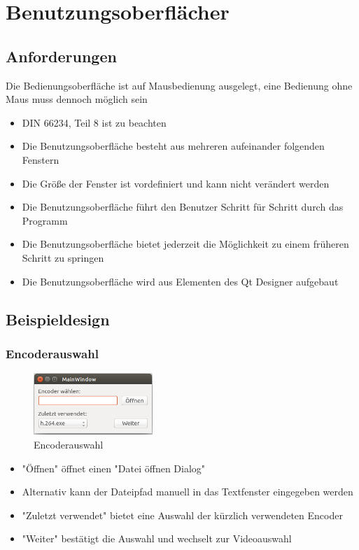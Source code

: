 \documentclass[parskip=full]{scrartcl}
\begin{document}
\section{Benutzungsoberflächer}
\subsection{Anforderungen}
Die Bedienungsoberfläche ist auf Mausbedienung ausgelegt, eine Bedienung ohne Maus muss dennoch möglich sein
\begin{itemize}
\item DIN 66234, Teil 8 ist zu beachten
\item Die Benutzungsoberfläche besteht aus mehreren aufeinander folgenden Fenstern
\item Die Größe der Fenster ist vordefiniert und kann nicht verändert werden
\item Die Benutzungsoberfläche führt den Benutzer Schritt für Schritt durch das Programm
\item Die Benutzungsoberfläche bietet jederzeit die Möglichkeit zu einem früheren Schritt zu springen
\item Die Benutzungsoberfläche wird aus Elementen des Qt Designer aufgebaut
\end{itemize}
\subsection{Beispieldesign}
\subsubsection{Encoderauswahl}
\begin{figure}[htbp] 
\centering
\includegraphics[width=0.4\textwidth]{GUI_Entwurf_1/GUI_1.png}
\caption{Encoderauswahl}
\end{figure}
\begin{itemize}
\item "Öffnen" öffnet einen "Datei öffnen Dialog"
\item Alternativ kann der Dateipfad manuell in das Textfenster eingegeben werden
\item "Zuletzt verwendet" bietet eine Auswahl der kürzlich verwendeten Encoder
\item "Weiter" bestätigt die Auswahl und wechselt zur Videoauswahl
\end{itemize}
\end{document}
